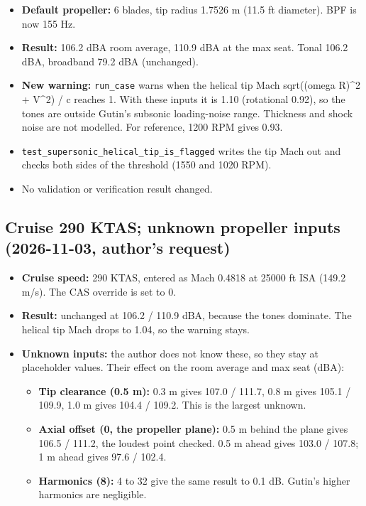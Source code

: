 \documentclass[10pt,a4paper]{article}
\begin{document}
\begin{itemize}
\item \textbf{Default propeller:} 6 blades, tip radius 1.7526 m (11.5 ft diameter). BPF is now 155 Hz.
\item \textbf{Result:} 106.2 dBA room average, 110.9 dBA at the max seat. Tonal 106.2 dBA, broadband 79.2 dBA (unchanged).
\item \textbf{New warning:} \texttt{run\_\allowbreak{}case} warns when the helical tip Mach sqrt((omega R)\textasciicircum{}2 + V\textasciicircum{}2) / c reaches 1. With these inputs it is 1.10 (rotational 0.92), so the tones are outside Gutin's subsonic loading-noise range. Thickness and shock noise are not modelled. For reference, 1200 RPM gives 0.93.
\item \texttt{test\_\allowbreak{}supersonic\_\allowbreak{}helical\_\allowbreak{}tip\_\allowbreak{}is\_\allowbreak{}flagged} writes the tip Mach out and checks both sides of the threshold (1550 and 1020 RPM).
\item No validation or verification result changed.
\end{itemize}

\subsection*{Cruise 290 KTAS; unknown propeller inputs (2026-11-03, author's request)}

\begin{itemize}
\item \textbf{Cruise speed:} 290 KTAS, entered as Mach 0.4818 at 25000 ft ISA (149.2 m/s). The CAS override is set to 0.
\item \textbf{Result:} unchanged at 106.2 / 110.9 dBA, because the tones dominate. The helical tip Mach drops to 1.04, so the warning stays.
\item \textbf{Unknown inputs:} the author does not know these, so they stay at placeholder values. Their effect on the room average and max seat (dBA):
\begin{itemize}
\item \textbf{Tip clearance (0.5 m):} 0.3 m gives 107.0 / 111.7, 0.8 m gives 105.1 / 109.9, 1.0 m gives 104.4 / 109.2. This is the largest unknown.
\item \textbf{Axial offset (0, the propeller plane):} 0.5 m behind the plane gives 106.5 / 111.2, the loudest point checked. 0.5 m ahead gives 103.0 / 107.8; 1 m ahead gives 97.6 / 102.4.
\item \textbf{Harmonics (8):} 4 to 32 give the same result to 0.1 dB. Gutin's higher harmonics are negligible.
\end{itemize}
\end{itemize}
\end{document}
